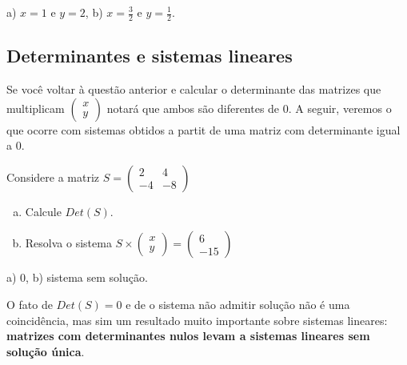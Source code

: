 \documentclass[main_estudante.tex]{subfiles}
\begin{document}
\begin{gabarito}
	\begin{gabaritoQuestao}
		a) $x=1$ e $y=2$, b) $x=\frac{3}{2}$ e $y=\frac{1}{2}$.
	\end{gabaritoQuestao}
\end{gabarito}

\subsection*{Determinantes e sistemas lineares}

Se você voltar à questão anterior e calcular o determinante das matrizes que multiplicam $\begin{pmatrix}x \\ y\end{pmatrix}$ notará que ambos são diferentes de 0. A seguir, veremos o que ocorre com sistemas obtidos a partit de uma matriz com determinante igual a 0.

\begin{questao}
Considere a matriz $S=\begin{pmatrix}2 & 4 \\ -4 & -8\end{pmatrix}$
\begin{enumerate}[a)]
\item Calcule $Det(S)$.
\item Resolva o sistema $S \times \begin{pmatrix}x \\ y\end{pmatrix} = \begin{pmatrix}6 \\ -15\end{pmatrix}$
\end{enumerate}
\end{questao}

\begin{gabarito}
	\begin{gabaritoQuestao}
		a) $0$, b) sistema sem solução.
	\end{gabaritoQuestao}
\end{gabarito}

O fato de $Det(S)=0$ e de o sistema não admitir solução não é uma coincidência, mas sim um resultado muito importante sobre sistemas lineares: \textbf{matrizes com determinantes nulos levam a sistemas lineares sem solução única}.
\end{document}
